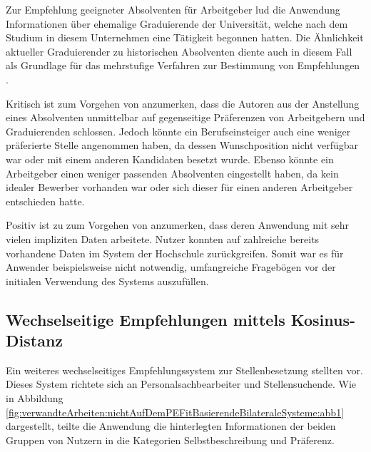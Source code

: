 Zur Empfehlung geeigneter Absolventen für Arbeitgeber lud die Anwendung Informationen über ehemalige Graduierende der Universität, welche nach dem Studium in diesem Unternehmen eine Tätigkeit begonnen hatten. Die Ähnlichkeit aktueller Graduierender zu historischen Absolventen diente auch in diesem Fall als Grundlage für das mehrstufige Verfahren zur Bestimmung von Empfehlungen \cite[S. 1ff.]{ding:2016}.

Kritisch ist zum Vorgehen von \textcite[S. 1ff.]{ding:2016} anzumerken, dass die Autoren aus der Anstellung eines Absolventen unmittelbar auf gegenseitige Präferenzen von Arbeitgebern und Graduierenden schlossen. Jedoch könnte ein Berufseinsteiger auch eine weniger präferierte Stelle angenommen haben, da dessen Wunschposition nicht verfügbar war oder mit einem anderen Kandidaten besetzt wurde. Ebenso könnte ein Arbeitgeber einen weniger passenden Absolventen eingestellt haben, da kein idealer Bewerber vorhanden war oder sich dieser für einen anderen Arbeitgeber entschieden hatte.

Positiv ist zu zum Vorgehen von \textcite[S. 1ff.]{ding:2016} anzumerken, dass deren Anwendung mit sehr vielen impliziten Daten arbeitete. Nutzer konnten auf zahlreiche bereits vorhandene Daten im System der Hochschule zurückgreifen. Somit war es für Anwender beispielsweise nicht notwendig, umfangreiche Fragebögen vor der initialen Verwendung des Systems auszufüllen.

\subsection{Wechselseitige Empfehlungen mittels Kosinus-Distanz}
\label{ch:verwandteArbeiten:nichtAufDemPEFitBasierendeBilateraleSysteme:nutzer}
Ein weiteres wechselseitiges Empfehlungssystem zur Stellenbesetzung stellten \textcite[S. 1ff.]{wenxing:2015} vor. Dieses System richtete sich an Personalsachbearbeiter und Stellensuchende. Wie in Abbildung \ref{fig:verwandteArbeiten:nichtAufDemPEFitBasierendeBilateraleSysteme:abb1} dargestellt, teilte die Anwendung die hinterlegten Informationen der beiden Gruppen von Nutzern in die Kategorien Selbstbeschreibung und Präferenz.

